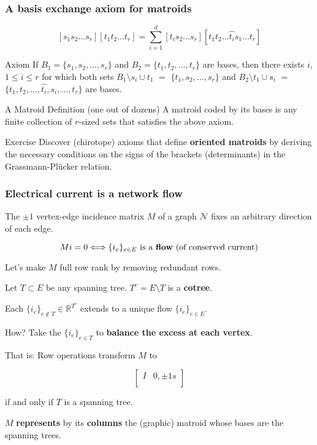 \documentclass{beamer}
\newcommand{\Reals}{\ensuremath{\mathbb{R}}}
\begin{document}
\begin{frame}
\frametitle{A basis exchange axiom for matroids}

\[
[s_1 s_2 ... s_r][t_1 t_2 ... t_r] = 
\sum_{i=1}^d [t_i s_2 ... s_r][t_1 t_2 ... \hat{t_i} s_1 ... t_r]
\]

\begin{block}{Axiom}
If $B_1= \{s_1, s_2, \ldots, s_r\}$ and 
$B_2= \{t_1, t_2, \ldots, t_r\}$ are bases, 
then
there exists
$i$, $1 \le i \le r$ for which both sets
$B_1\setminus s_i \cup t_1$ $=$ 
$\{t_1, s_2, \ldots,  s_r\}$ 
and 
$B_2 \setminus t_1 \cup s_i$ $=$ 
$\{t_1, t_2, \ldots, \hat{t_i}, s_i, \ldots, t_r\}$ 
are bases.
\end{block}

\begin{block}{A Matroid Definition (one out of dozens)}
A matroid coded by its bases is any 
finite collection of $r$-sized sets that satisfies the
above axiom.
\end{block}

\begin{block}{Exercise}
Discover (chirotope) axioms that define \textbf{oriented matroids} by 
deriving the necessary conditions on the signs of the 
brackets (determinants) in the Grassmann-Pl\"{u}cker
relation.
\end{block}

\end{frame}


\begin{frame}[fragile]
\frametitle{Electrical current is a network flow}

The $\pm 1$ vertex-edge incidence matrix $M$
of a graph $\mathcal{N}$ fixes 
an arbitrary direction of each edge.

\[
Mi=0 \Longleftrightarrow \{i_e\}_{e\in E} \text{ is a \textbf{flow} (of conserved
current)}
\]

Let's make $M$ full row rank by removing redundant rows.

Let $T\subset E$ be any spanning tree.  $T^c = E\setminus T$ is a 
\textbf{cotree}.

Each $\{i_e\}_{e\not\in T} \in \Reals^{T^c}$ extends to a unique flow 
$\{i_e\}_{e\in E}$. 

How?  Take the $\{i_e\}_{e\in T}$ to \textbf{balance
the excess at each vertex}.

That is: Row operations transform $M$ to 

\[
\left[
\begin{array}{c|c}
 I & 0,\pm 1 s \\
\end{array}
\right]
\]

\begin{center}
if and only if $T$ is a spanning tree.
\end{center}

$M$ \textbf{represents} by its \textbf{columns} the (graphic) 
matroid whose bases are the spanning trees.

\end{frame}
\end{document}
